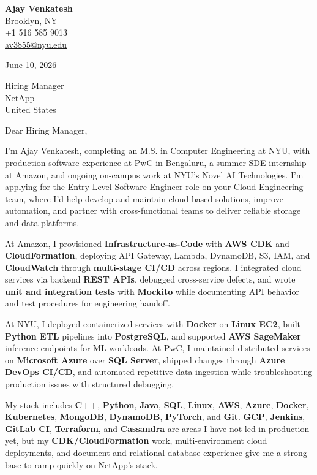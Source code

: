 \documentclass[letterpaper,11pt]{article}
\begin{document}
\begin{flushleft}
\textbf{\large Ajay Venkatesh} \\
Brooklyn, NY \\
+1 516 585 9013 \\
\href{mailto:av3855@nyu.edu}{av3855@nyu.edu}
\end{flushleft}
\vspace{10pt}
June 10, 2026
\vspace{6pt}

Hiring Manager \\
NetApp \\
United States

\vspace{10pt}

Dear Hiring Manager,

I'm Ajay Venkatesh, completing an M.S. in Computer Engineering at NYU, with production software experience at PwC in Bengaluru, a summer SDE internship at Amazon, and ongoing on-campus work at NYU's Novel AI Technologies. I'm applying for the Entry Level Software Engineer role on your Cloud Engineering team, where I'd help develop and maintain cloud-based solutions, improve automation, and partner with cross-functional teams to deliver reliable storage and data platforms.

At Amazon, I provisioned \textbf{Infrastructure-as-Code} with \textbf{AWS CDK} and \textbf{CloudFormation}, deploying API Gateway, Lambda, DynamoDB, S3, IAM, and \textbf{CloudWatch} through \textbf{multi-stage CI/CD} across regions. I integrated cloud services via backend \textbf{REST APIs}, debugged cross-service defects, and wrote \textbf{unit and integration tests} with \textbf{Mockito} while documenting API behavior and test procedures for engineering handoff.

At NYU, I deployed containerized services with \textbf{Docker} on \textbf{Linux EC2}, built \textbf{Python ETL} pipelines into \textbf{PostgreSQL}, and supported \textbf{AWS SageMaker} inference endpoints for ML workloads. At PwC, I maintained distributed services on \textbf{Microsoft Azure} over \textbf{SQL Server}, shipped changes through \textbf{Azure DevOps CI/CD}, and automated repetitive data ingestion while troubleshooting production issues with structured debugging.

My stack includes \textbf{C++}, \textbf{Python}, \textbf{Java}, \textbf{SQL}, \textbf{Linux}, \textbf{AWS}, \textbf{Azure}, \textbf{Docker}, \textbf{Kubernetes}, \textbf{MongoDB}, \textbf{DynamoDB}, \textbf{PyTorch}, and \textbf{Git}. \textbf{GCP}, \textbf{Jenkins}, \textbf{GitLab CI}, \textbf{Terraform}, and \textbf{Cassandra} are areas I have not led in production yet, but my \textbf{CDK/CloudFormation} work, multi-environment cloud deployments, and document and relational database experience give me a strong base to ramp quickly on NetApp's stack.
\end{document}
